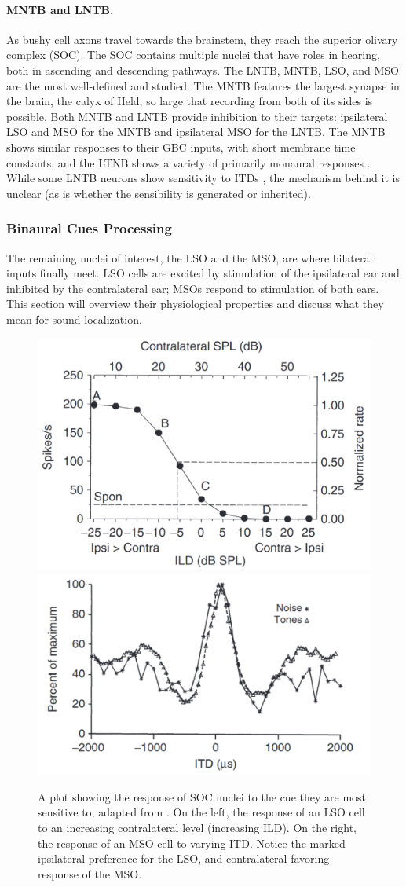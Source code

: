 \documentclass[11pt,a4paper]{article}
\begin{document}
\paragraph{MNTB and LNTB.}
As bushy cell axons travel towards the brainstem, they reach the superior olivary complex (SOC). The SOC contains multiple nuclei that have roles in hearing, both in ascending and descending pathways. The LNTB, MNTB, LSO, and MSO are the most well-defined and studied. The MNTB features the largest synapse in the brain, the calyx of Held, so large that recording from both of its sides is possible. Both MNTB and LNTB provide inhibition to their targets: ipsilateral LSO and MSO for the MNTB and ipsilateral MSO for the LNTB. The MNTB shows similar responses to their GBC inputs, with short membrane time constants, and the LTNB shows a variety of primarily monaural responses \cite{guinanSingleAuditoryUnits1972}\cite{tsuchitaniFunctionalOrganizationLateral1977}. While some LNTB neurons show sensitivity to ITDs \cite{frankenVivoWholeCellRecordings2016}, the mechanism behind it is unclear (as is whether the sensibility is generated or inherited).

\subsubsection{Binaural Cues Processing}\label{bio-binaural}
The remaining nuclei of interest, the LSO and the MSO, are where bilateral inputs finally meet. LSO cells are excited by stimulation of the ipsilateral ear and inhibited by the contralateral ear; MSOs respond to stimulation of both ears. This section will overview their physiological properties and discuss what they mean for sound localization.

\begin{figure}[H]
    \centering
    \includegraphics[width=0.48\linewidth]{Images/LSO-to-ILD.png}
    \includegraphics[width=0.48\linewidth]{Images/MSO-to-ITD.png}
    \caption{A plot showing the response of SOC nuclei to the cue they are most sensitive to, adapted from \cite{yinNeuralMechanismsBinaural2019}. On the left, the response of an LSO cell to an increasing contralateral level (increasing ILD). On the right, the response of an MSO cell to varying ITD. Notice the marked ipsilateral preference for the LSO, and contralateral-favoring response of the MSO.}
    \label{fig:lso-mso-expected}
\end{figure}
\end{document}
